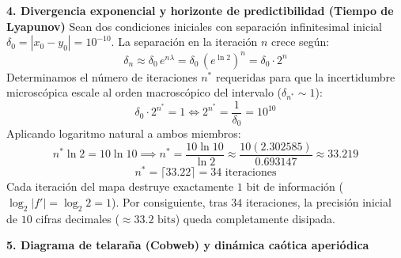 \documentclass[11pt,a4paper]{article}
\newenvironment{solucion}[1][Solución Detallada]{%
    \vspace{1.5mm}%
    \noindent{\large\textbf{Solución:}}\par\vspace{1.5mm}%
}{%
    \par\vspace{3mm}%
}
\begin{document}
\begin{solucion}
\vspace{3.5mm}

\textbf{\large 4. Divergencia exponencial y horizonte de predictibilidad (Tiempo de Lyapunov)}
Sean dos condiciones iniciales con separación infinitesimal inicial $\delta_0 = |x_0 - y_0| = 10^{-10}$.
La separación en la iteración $n$ crece según:
\[
\delta_n \approx \delta_0 \, e^{n\lambda} = \delta_0 \, (e^{\ln 2})^n = \delta_0 \cdot 2^n
\]
Determinamos el número de iteraciones $n^*$ requeridas para que la incertidumbre microscópica escale al orden macroscópico del intervalo ($\delta_{n^*} \sim 1$):
\[
\delta_0 \cdot 2^{n^*} = 1 \iff 2^{n^*} = \frac{1}{\delta_0} = 10^{10}
\]
Aplicando logaritmo natural a ambos miembros:
\[
n^* \ln 2 = 10 \ln 10 \implies n^* = \frac{10 \ln 10}{\ln 2} \approx \frac{10(2.302585)}{0.693147} \approx 33.219
\]
\[
\boxed{n^* = \lceil 33.22 \rceil = 34 \text{ iteraciones}}
\]
Cada iteración del mapa destruye exactamente $1\text{ bit}$ de información ($\log_2 |f'| = \log_2 2 = 1$). Por consiguiente, tras $34$ iteraciones, la precisión inicial de $10$ cifras decimales ($\approx 33.2\text{ bits}$) queda completamente disipada.

\vspace{3.5mm}

\textbf{\large 5. Diagrama de telaraña (Cobweb) y dinámica caótica aperiódica}

\begin{center}
\end{center}
\end{solucion}
\end{document}
